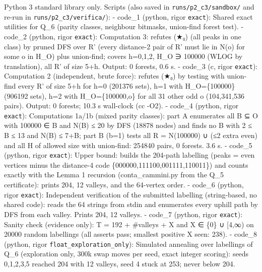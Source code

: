 \documentclass[11pt,a4paper]{article}
\begin{document}
Python 3 standard library only. Scripts (also saved in
\texttt{runs/p2\_c3/sandbox/} and re-run in
\texttt{runs/p2\_c3/verifica/}): - code\_1 (python, rigor
\texttt{exact}): Shared exact utilities for Q\_6 (parity classes,
neighbour bitmasks, union-find forest test). - code\_2 (python, rigor
\texttt{exact}): Computation 3: refutes (★₀) (all peaks in one class) by
pruned DFS over R' (every distance-2 pair of R' must lie in N(o) for
some o in H\_O) plus union-find; covers h=0,1,2, H\_O ∋ 100000 (WLOG by
translation), all R' of size 5+h. Output: 0 forests, 0.6 s. - code\_3
(c, rigor \texttt{exact}): Computation 2 (independent, brute force):
refutes (★₀) by testing with union-find every R' of size 5+h for h=0
(201376 sets), h=1 with H\_O=\{100000\} (906192 sets), h=2 with
H\_O=\{100000,o\} for all 31 other odd o (104,341,536 pairs). Output: 0
forests; 10.3 s wall-clock (cc -O2). - code\_4 (python, rigor
\texttt{exact}): Computations 1a/1b (mixed parity classes): part A
enumerates all B ⊆ O with 100000 ∈ B and \textbar N(B)\textbar{} ≤ 20 by
DFS (18878 nodes) and finds no B with 2 ≤ \textbar B\textbar{} ≤ 13 and
\textbar N(B)\textbar{} ≤ 7+\textbar B\textbar; part B (b=1) tests all R
= N(100000) ∪ (≤2 extra even) and all H of allowed size with union-find:
254840 pairs, 0 forests. 3.6 s. - code\_5 (python, rigor
\texttt{exact}): Upper bound: builds the 204-path labelling (peaks =
even vertices minus the distance-4 code \{000000,111100,001111,110011\})
and counts exactly with the Lemma 1 recursion (conta\_cammini.py from
the Q\_5 certificate): prints 204, 12 valleys, and the 64-vertex order.
- code\_6 (python, rigor \texttt{exact}): Independent verification of
the submitted labelling (string-based, no shared code): reads the 64
strings from stdin and enumerates every uphill path by DFS from each
valley. Prints 204, 12 valleys. - code\_7 (python, rigor
\texttt{exact}): Sanity check (evidence only): T = 192 + \#valleys + X
and X ∈ \{0\} ∪ {[}4,∞) on 20000 random labellings (all asserts pass;
smallest positive X seen: 238). - code\_8 (python, rigor
\texttt{float\_exploration\_only}): Simulated annealing over labellings
of Q\_6 (exploration only, 300k swap moves per seed, exact integer
scoring): seeds 0,1,2,3,5 reached 204 with 12 valleys, seed 4 stuck at
253; never below 204.
\end{document}
